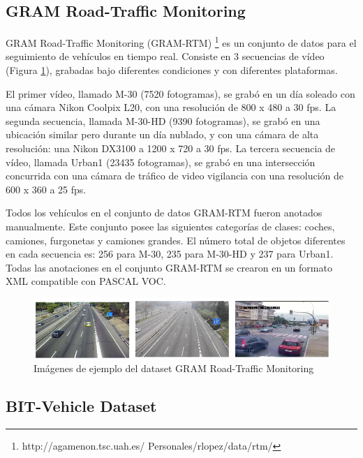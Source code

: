 \subsection{GRAM Road-Traffic Monitoring}

GRAM Road-Traffic Monitoring (GRAM-RTM) \footnote{http://agamenon.tsc.uah.es/
Personales/rlopez/data/rtm/} \cite{gram-tracking} \cite{gram} es un conjunto de datos para el seguimiento de vehículos en tiempo real. Consiste en 3 secuencias de vídeo (Figura \ref{fig.gram}), grabadas bajo diferentes condiciones y con diferentes plataformas.

El primer vídeo, llamado M-30 (7520 fotogramas), se grabó en un día soleado con una cámara Nikon Coolpix L20, con una resolución de 800 x 480 a 30 \acrshort{fps}. La segunda secuencia, llamada M-30-HD (9390 fotogramas), se grabó en una ubicación similar pero durante un día nublado, y con una cámara de alta resolución: una Nikon DX3100 a 1200 x 720 a 30 \acrshort{fps}. La tercera secuencia de vídeo, llamada Urban1 (23435 fotogramas), se grabó en una intersección concurrida con una cámara de tráfico de video vigilancia con una resolución de 600 x 360 a 25 \acrshort{fps}.

Todos los vehículos en el conjunto de datos GRAM-RTM fueron anotados manualmente. Este conjunto posee las siguientes categorías de clases: coches, camiones, furgonetas y camiones grandes. El número total de objetos diferentes en cada secuencia es: 256 para M-30, 235 para M-30-HD y 237 para Urban1. Todas las anotaciones en el conjunto GRAM-RTM se crearon en un formato XML compatible con PASCAL VOC.

\begin{figure}
\begin{center}
	\includegraphics[width=1\textwidth]{figures/Estado_arte/gram.png}
   \caption{Imágenes de ejemplo del dataset GRAM Road-Traffic Monitoring}
	\label{fig.gram}
\end{center}
\end{figure}

\subsection{BIT-Vehicle Dataset}


